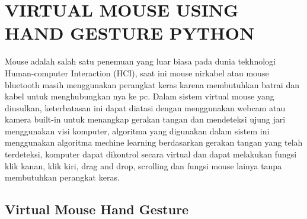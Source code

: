 \chapter{VIRTUAL MOUSE USING HAND GESTURE PYTHON}

Mouse adalah salah satu penemuan yang luar biasa pada dunia tekhnologi Human-computer Interaction (HCI), saat ini mouse nirkabel atau mouse bluetooth masih menggunakan perangkat keras karena membutuhkan batrai dan kabel 	untuk menghubungkan nya ke pc. Dalam sistem virtual mouse yang diusulkan, keterbatasan ini dapat diatasi dengan menggunakan webcam atau kamera built-in untuk menangkap gerakan tangan dan mendeteksi ujung jari menggunakan visi komputer, algoritma yang digunakan dalam sistem ini menggunakan algoritma mechine learning berdasarkan gerakan tangan yang telah terdeteksi, komputer dapat dikontrol secara virtual dan dapat melakukan fungsi klik kanan, klik kiri, drag and drop, scrolling dan fungsi mouse lainya tanpa membutuhkan perangkat keras.


\section{Virtual Mouse Hand Gesture}

